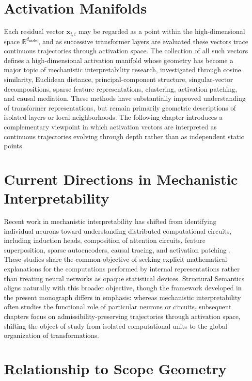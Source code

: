 \documentclass[11pt,twoside,openright]{book}
\numberwithin{equation}{chapter}
\theoremstyle{definition}
\theoremstyle{plain}
\theoremstyle{remark}
\theoremstyle{definition}
\begin{document}
\section{Activation Manifolds}

Each residual vector $\mathbf{x}_{l,t}$ may be regarded as a point within
the high-dimensional space $\mathbb{R}^{d_{\mathrm{model}}}$, and as
successive transformer layers are evaluated these vectors trace
continuous trajectories through activation space. The collection of all
such vectors defines a high-dimensional activation manifold whose
geometry has become a major topic of mechanistic interpretability
research, investigated through cosine similarity, Euclidean distance,
principal-component structure, singular-vector decompositions, sparse
feature representations, clustering, activation patching, and causal
mediation. These methods have substantially improved understanding of
transformer representations, but remain primarily geometric descriptions
of isolated layers or local neighborhoods. The following chapter
introduces a complementary viewpoint in which activation vectors are
interpreted as continuous trajectories evolving through depth rather than
as independent static points.

\section{Current Directions in Mechanistic Interpretability}

Recent work in mechanistic interpretability has shifted from identifying
individual neurons toward understanding distributed computational
circuits, including induction heads, composition of attention circuits,
feature superposition, sparse autoencoders, causal tracing, and
activation patching \cite{Elhage2021,Anthropic2023,Templeton2024}. These
studies share the common objective of seeking explicit mathematical
explanations for the computations performed by internal representations
rather than treating neural networks as opaque statistical devices.
Structural Semantics aligns naturally with this broader objective, though
the framework developed in the present monograph differs in emphasis:
whereas mechanistic interpretability often studies the functional role of
particular neurons or circuits, subsequent chapters focus on
admissibility-preserving trajectories through activation space, shifting
the object of study from isolated computational units to the global
organization of transformations.

\section{Relationship to Scope Geometry}
\end{document}
